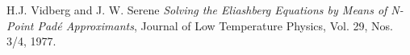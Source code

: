 \begin{thebibliography}{9}

  H.J. Vidberg and J. W. Serene
  \emph{Solving the Eliashberg Equations by Means of N-Point Padé Approximants},
  Journal of Low Temperature Physics,
  Vol. 29, Nos. 3/4,
  1977.

\end{thebibliography}

